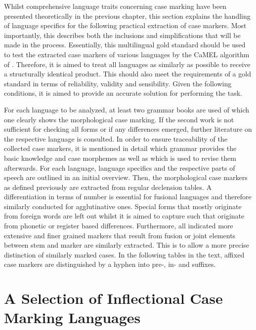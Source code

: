 \documentclass[11pt,a4paper,twoside,openright]{scrbook}
\begin{document}
Whilst comprehensive language traits concerning case marking have been presented theoretically in the previous chapter, this section explains the handling of language specifics for the following practical extraction of case markers. Most importantly, this describes both the inclusions and simplifications that will be made in the process. Essentially, this multilingual gold standard should be used to test the extracted case markers of various languages by the CaMEL algorithm of \citet{weissweiler2022camel}. Therefore, it is aimed to treat all languages as similarly as possible to receive a structurally identical product. This should also meet the requirements of a gold standard in terms of reliability, validity and sensibility. Given the following conditions, it is aimed to provide an accurate solution for performing the task. 

For each language to be analyzed, at least two grammar books are used of which one clearly shows the morphological case marking. If the second work is not sufficient for checking all forms or if any differences emerged, further literature on the respective language is consulted. In order to ensure traceability of the collected case markers, it is mentioned in detail which grammar provides the basic knowledge and case morphemes as well as which is used to revise them afterwards. For each language, language specifics and the respective parts of speech are outlined in an initial overview. Then, the morphological case markers as defined previously are extracted from regular declension tables. A differentiation in terms of number is essential for fusional languages and therefore similarly conducted for agglutinative ones. Special forms that mostly originate from foreign words are left out whilst it is aimed to capture such that originate from phonetic or register based differences. Furthermore, all indicated more extensive and finer grained markers that result from fusion or joint elements between stem and marker are similarly extracted. This is to allow a more precise distinction of similarly marked cases. In the following tables in the text, affixed case markers are distinguished by a hyphen into pre-, in- and suffixes. 




\section{A Selection of Inflectional Case Marking Languages}
\end{document}
